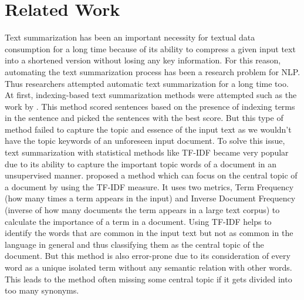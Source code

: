 \documentclass[acmlarge]{acmart}
\begin{document}
\section{Related Work}\label{sec:literature-review}
Text summarization has been an important necessity for textual data consumption for a long time because of its ability to compress a given input text into a shortened version without losing any key information. For this reason, automating the text summarization process has been a research problem for NLP. Thus researchers attempted automatic text summarization for a long time too. At first, indexing-based text summarization methods were attempted such as the work by \citeauthor{Baxendale_1958_firstsummarization} \cite{Baxendale_1958_firstsummarization}. This method scored sentences based on the presence of indexing terms in the sentence and picked the sentences with the best score. But this type of method failed to capture the topic and essence of the input text as we wouldn't have the topic keywords of an unforeseen input document. To solve this issue, text summarization with statistical methods like TF-IDF became very popular due to its ability to capture the important topic words of a document in an unsupervised manner. \citeauthor{edmundson_1969_earlysum} \cite{edmundson_1969_earlysum} proposed a method which can focus on the central topic of a document by using the TF-IDF measure. It uses two metrics, Term Frequency (how many times a term appears in the input) and Inverse Document Frequency (inverse of how many documents the term appears in a large text corpus) to calculate the importance of a term in a document. Using TF-IDF helps to identify the words that are common in the input text but not as common in the language in general and thus classifying them as the central topic of the document. But this method is also error-prone due to its consideration of every word as a unique isolated term without any semantic relation with other words. This leads to the method often missing some central topic if it gets divided into too many synonyms.\\ 
\end{document}
